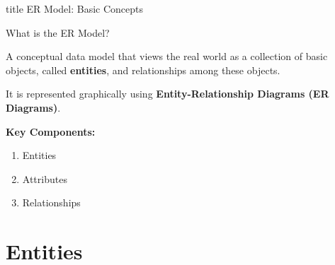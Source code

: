 \documentclass[aspectratio=169, xcolor=dvipsnames]{beamer}
\begin{document}
\begin{frame}
  \vfill
  \centering
  \begin{beamercolorbox}[sep=8pt,center,shadow=true,rounded=true]{title}
    ER Model: Basic Concepts\par%
  \end{beamercolorbox}
  \vfill
\end{frame}

\begin{frame}{What is the ER Model?}
    \begin{definition}
    A conceptual data model that views the real world as a collection of basic objects, called \textbf{entities}, and relationships among these objects.
    \end{definition}
    
    \vspace{1em}
    It is represented graphically using \textbf{Entity-Relationship Diagrams (ER Diagrams)}.
    
    \vspace{1em}
    \textbf{Key Components:}
    \begin{enumerate}
        \item Entities
        \item Attributes
        \item Relationships
    \end{enumerate}
\end{frame}

\section{Entities}
\end{document}
